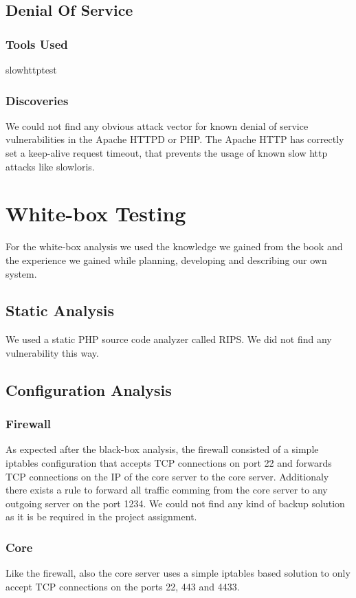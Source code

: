 \documentclass{article}
\begin{document}
\subsection{Denial Of Service}
\subsubsection{Tools Used}
slowhttptest

\subsubsection{Discoveries}
We could not find any obvious attack vector for known denial of service vulnerabilities in the Apache HTTPD or PHP. The Apache HTTP has correctly set a keep-alive request timeout, that prevents the usage of known slow http attacks like slowloris.

\section{White-box Testing}
For the white-box analysis we used the knowledge we gained from the book and the experience we gained while planning, developing and describing our own system.

\subsection{Static Analysis}
We used a static PHP source code analyzer called RIPS. We did not find any vulnerability this way.

\subsection{Configuration Analysis}
\subsubsection{Firewall}
As expected after the black-box analysis, the firewall consisted of a simple iptables configuration that accepts TCP connections on port 22 and forwards TCP connections on the IP of the core server to the core server. Additionaly there exists a rule to forward all traffic comming from the core server to any outgoing server on the port 1234.
We could not find any kind of backup solution as it is be required in the project assignment.

\subsubsection{Core}
Like the firewall, also the core server uses a simple iptables based solution to only accept TCP connections on the ports 22, 443 and 4433.
\end{document}
